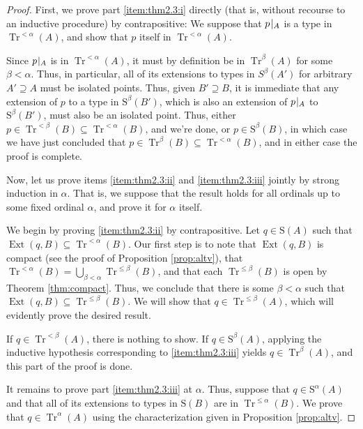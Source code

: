 \documentclass{article}
\theoremstyle{nonumberplain}
\newtheorem{proof}{Proof}
\newcommand{\Stone}{\mathrm{S}}
\DeclareMathOperator{\Tr}{Tr}
\DeclareMathOperator{\Ext}{Ext}
\newcommand{\rst}[2]{#1\mspace{1.3mu plus 0.5mu minus 0.5mu}|_{#2}}
\begin{document}
\begin{proof}
First, we prove part \ref{item:thm2.3:i} directly (that is, without recourse to an inductive procedure) by contrapositive: We suppose that $\rst p A$ is a type in $\Tr^{<\alpha}(A)$, and show that $p$ itself in $\Tr^{<\alpha}(A)$.

Since $\rst p A$ is in $\Tr^{<\alpha}(A)$, it must by definition be in $\Tr^\beta(A)$ for some $\beta < \alpha$. Thus, in particular, all of its extensions to types in $S^\beta(A')$ for arbitrary $A' \supseteq A$ must be isolated points. Thus, given $B' \supseteq B$, it is immediate that any extension of $p$ to a type in $\Stone^\beta(B')$, which is also an extension of $\rst p A$ to $\Stone^\beta(B')$, must also be an isolated point. Thus, either $p \in \Tr^{<\beta}(B) \subseteq \Tr^{<\alpha}(B)$, and we're done, or $p \in \Stone^\beta(B)$, in which case we have just concluded that $p \in \Tr^\beta(B) \subseteq \Tr^{<\alpha}(B)$, and in either case the proof is complete.

\smallskip

Now, let us prove items \ref{item:thm2.3:ii} and \ref{item:thm2.3:iii} jointly by strong induction in $\alpha$. That is, we suppose that the result holds for all ordinals up to some fixed ordinal $\alpha$, and prove it for $\alpha$ itself.

We begin by proving \ref{item:thm2.3:ii} by contrapositive. Let $q \in \Stone(A)$ such that $\Ext(q,B) \subseteq \Tr^{<\alpha}(B)$. Our first step is to note that $\Ext(q,B)$ is compact (see the proof of Proposition \ref{prop:altv}), that $\Tr^{<\alpha}(B) = \bigcup_{\beta < \alpha} \Tr^{\leq\beta}(B)$, and that each $\Tr^{\leq\beta}(B)$ is open by Theorem \ref{thm:compact}. Thus, we conclude that there is some $\beta < \alpha$ such that $\Ext(q,B) \subseteq \Tr^{\leq\beta}(B)$. We will show that $q \in \Tr^{\leq\beta}(A)$, which will evidently prove the desired result.

If $q \in \Tr^{<\beta}(A)$, there is nothing to show. If $q \in \Stone^\beta(A)$, applying the inductive hypothesis corresponding to \ref{item:thm2.3:iii} yields $q \in \Tr^\beta(A)$, and this part of the proof is done.

It remains to prove part \ref{item:thm2.3:iii} at $\alpha$. Thus, suppose that $q \in \Stone^\alpha(A)$ and that all of its extensions to types in $\Stone(B)$ are in $\Tr^{\leq \alpha}(B)$. We prove that $q \in \Tr^\alpha(A)$ using the characterization given in Proposition \ref{prop:altv}.


\end{proof}
\end{document}
